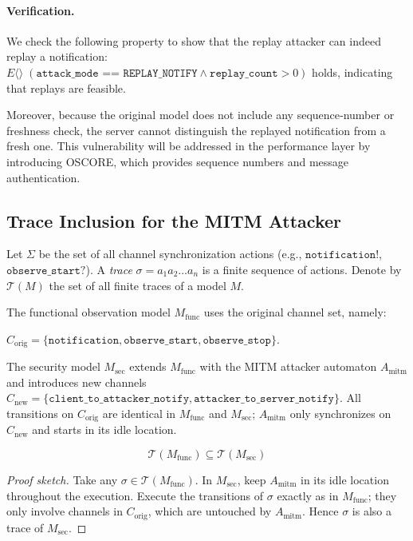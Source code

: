 \documentclass[a4paper,fleqn]{cas-sc}
\begin{document}
\paragraph{Verification.} We check the following property to show that the replay attacker can indeed replay a notification:
$E\langle\rangle\; (\texttt{attack\_mode == REPLAY\_NOTIFY} \land \texttt{replay\_count} > 0)$ holds, indicating that replays are feasible.

Moreover, because the original model does not include any sequence‑number or freshness check, the server cannot distinguish the replayed notification from a fresh one. This vulnerability will be addressed in the performance layer by introducing OSCORE, which provides sequence numbers and message authentication.

\subsection{Trace Inclusion for the MITM Attacker}
\label{sec:remark-mitm}

Let $\Sigma$ be the set of all channel synchronization actions (e.g., $\texttt{notification!}$, $\texttt{observe\_start?}$). 
A \emph{trace} $\sigma = a_1 a_2 \dots a_n$ is a finite sequence of actions. 
Denote by $\mathcal{T}(M)$ the set of all finite traces of a model $M$.

The functional observation model $M_{\text{func}}$ uses the original channel set, namely:

$C_{\text{orig}} = \{\texttt{notification}, \texttt{observe\_start}, \texttt{observe\_stop}\}$. 

The security model $M_{\text{sec}}$ extends $M_{\text{func}}$ with the MITM attacker automaton $A_{\text{mitm}}$ and introduces new channels 
$C_{\text{new}} = \{\texttt{client\_to\_attacker\_notify}, \texttt{attacker\_to\_server\_notify}\}$. 
All transitions on $C_{\text{orig}}$ are identical in $M_{\text{func}}$ and $M_{\text{sec}}$; $A_{\text{mitm}}$ only synchronizes on $C_{\text{new}}$ and starts in its idle location.


$$\mathcal{T}(M_{\text{func}}) \subseteq \mathcal{T}(M_{\text{sec}})$$
\begin{proof}[Proof sketch]
Take any $\sigma \in \mathcal{T}(M_{\text{func}})$. In $M_{\text{sec}}$, keep $A_{\text{mitm}}$ in its idle location throughout the execution. 
Execute the transitions of $\sigma$ exactly as in $M_{\text{func}}$; they only involve channels in $C_{\text{orig}}$, which are untouched by $A_{\text{mitm}}$. 
Hence $\sigma$ is also a trace of $M_{\text{sec}}$. 
\end{proof}
\end{document}

